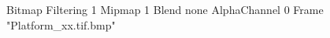 {Bitmap
	{Filtering 1}
	{Mipmap 1}
	{Blend none}
	{AlphaChannel 0}
	{Frame "Platform_xx.tif.bmp"}
}
